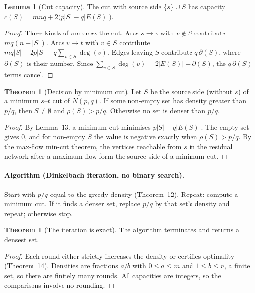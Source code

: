 \documentclass[11pt,a4paper]{article}
\theoremstyle{definition}
\newtheorem{theorem}[definition]{Theorem}
\newtheorem{lemma}[definition]{Lemma}
\begin{document}
\begin{lemma}[Cut capacity]
The cut with source side $\{s\} \cup S$ has capacity $c(S) = mnq + 2\bigl(p|S| - q|E(S)|\bigr)$.
\end{lemma}

\begin{proof}
Three kinds of arc cross the cut. Arcs $s \to v$ with $v \notin S$ contribute $mq(n - |S|)$. Arcs $v \to t$ with $v \in S$ contribute $mq|S| + 2p|S| - q\sum_{v \in S} \deg(v)$. Edges leaving $S$ contribute $q\,\partial(S)$, where $\partial(S)$ is their number. Since $\sum_{v \in S} \deg(v) = 2|E(S)| + \partial(S)$, the $q\,\partial(S)$ terms cancel.
\end{proof}

\begin{theorem}[Decision by minimum cut]
Let $S$ be the source side (without $s$) of a minimum $s$--$t$ cut of $N(p, q)$. If some non-empty set has density greater than $p/q$, then $S \ne \emptyset$ and $\rho(S) > p/q$. Otherwise no set is denser than $p/q$.
\end{theorem}

\begin{proof}
By Lemma~13, a minimum cut minimises $p|S| - q|E(S)|$. The empty set gives $0$, and for non-empty $S$ the value is negative exactly when $\rho(S) > p/q$. By the max-flow min-cut theorem, the vertices reachable from $s$ in the residual network after a maximum flow form the source side of a minimum cut.
\end{proof}

\paragraph{Algorithm (Dinkelbach iteration, no binary search).} Start with $p/q$ equal to the greedy density (Theorem~12). Repeat: compute a minimum cut. If it finds a denser set, replace $p/q$ by that set's density and repeat; otherwise stop.

\begin{theorem}[The iteration is exact]
The algorithm terminates and returns a densest set.
\end{theorem}

\begin{proof}
Each round either strictly increases the density or certifies optimality (Theorem~14). Densities are fractions $a/b$ with $0 \le a \le m$ and $1 \le b \le n$, a finite set, so there are finitely many rounds. All capacities are integers, so the comparisons involve no rounding.
\end{proof}
\end{document}
